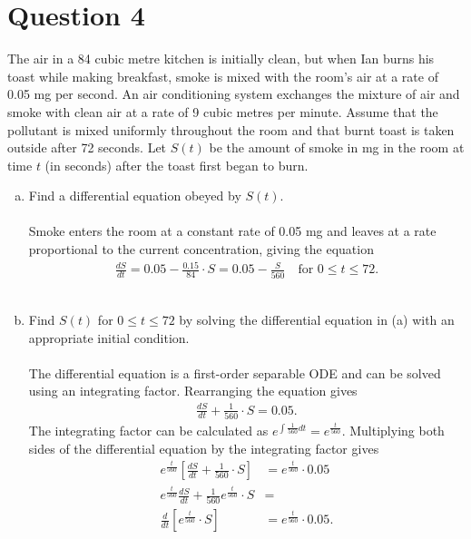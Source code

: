 \documentclass[reqno]{amsart}
\begin{document}
\newpage
\section*{\LARGE{Question 4}}

	The air in a 84 cubic metre kitchen is initially clean, but when Ian burns his toast while making breakfast, smoke is mixed with the room's air at a rate of 0.05 mg per second. An air conditioning system exchanges the mixture of air and smoke with clean air at a rate of 9 cubic metres per minute. Assume that the pollutant is mixed uniformly throughout the room and that burnt toast is taken outside after 72 seconds. Let $S(t)$ be the amount of smoke in mg in the room at time $t$ (in seconds) after the toast first began to burn.

	\begin{enumerate}[(a)]
		\item Find a differential equation obeyed by $S(t)$.
			\\ \\
			Smoke enters the room at a constant rate of 0.05 mg and leaves at a rate proportional to the current concentration, giving the equation
			\begin{align*}
				\frac{dS}{dt} = 0.05 - \frac{0.15}{84} \cdot S = 0.05 - \frac{S}{560} \quad \text{for } 0 \leq t \leq 72.
			\end{align*}
			\\
		\item Find $S(t)$ for $0 \leq t \leq 72$ by solving the differential equation in (a) with an appropriate initial condition.
			\\ \\
			The differential equation is a first-order separable ODE and can be solved using an integrating factor. Rearranging the equation gives
			\begin{align*}
				\frac{dS}{dt} + \frac{1}{560} \cdot S = 0.05.
			\end{align*}
			The integrating factor can be calculated as $e^{\int \frac{1}{560} dt} = e^{\frac{t}{560}}$. Multiplying both sides of the differential equation by the integrating factor gives
			\begin{align*}
				e^{\frac{t}{560}} \left[\frac{dS}{dt} + \frac{1}{560} \cdot S\right] &= e^{\frac{t}{560}} \cdot 0.05	\\
				e^{\frac{t}{560}} \frac{dS}{dt} + \frac{1}{560} e^{\frac{t}{560}} \cdot S &=							\\
				\frac{d}{dt} \left[e^{\frac{t}{560}} \cdot S\right] &= e^{\frac{t}{560}} \cdot 0.05.

\end{align*}
\end{enumerate}
\end{document}
